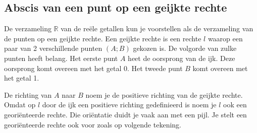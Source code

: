 \subsection{Abscis van een punt op een geijkte rechte}

De verzameling $\mathbb{R}$ van de re\"ele getallen kun je voorstellen als de verzameling van de punten op een geijkte rechte.
Een geijkte rechte is een rechte $l$ waarop een paar van 2 verschillende punten $(A;B)$ gekozen is.
De volgorde van zulke punten heeft belang.
Het eerste punt $A$ heet de oorsprong van de ijk.
Deze oorsprong komt overeen met het getal 0.
Het tweede punt $B$ komt overeen met het getal 1.


\begin{center}
\end{center}


De richting van $A$ naar $B$ noem je de positieve richting van de geijkte rechte.
Omdat op $l$ door de ijk een positieve richting gedefinieerd is noem je $l$ ook een geori\"enteerde rechte.
Die ori\"entatie duidt je vaak aan met een pijl.
Je stelt een geori\"enteerde rechte ook voor zoals op volgende tekening.

\begin{center}
\end{center}

